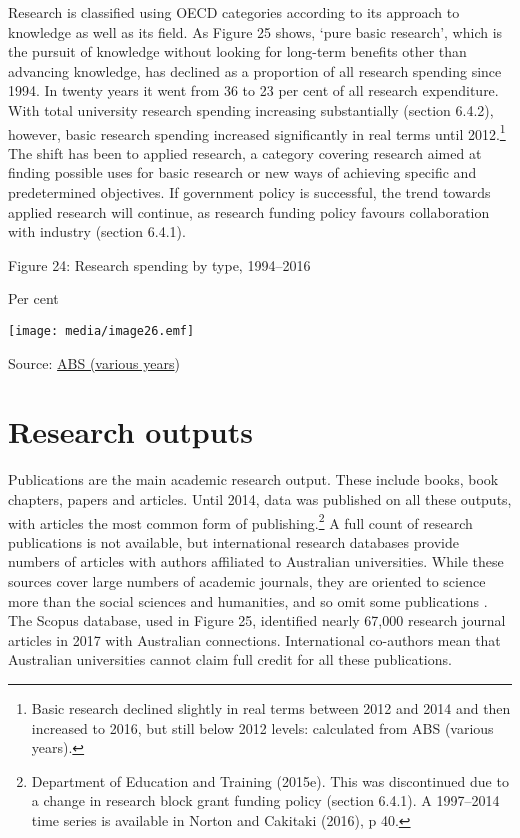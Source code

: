 \documentclass[]{book}
\begin{document}
Research is classified using OECD categories according to its approach to knowledge as well as its field. As Figure 25 shows, `pure basic research', which is the pursuit of knowledge without looking for long-term benefits other than advancing knowledge, has declined as a proportion of all research spending since 1994. In twenty years it went from 36 to 23 per cent of all research expenditure. With total university research spending increasing substantially (section 6.4.2), however, basic research spending increased significantly in real terms until 2012.\footnote{Basic research declined slightly in real terms between 2012 and 2014 and then increased to 2016, but still below 2012 levels: calculated from ABS (various years).} The shift has been to applied research, a category covering research aimed at finding possible uses for basic research or new ways of achieving specific and predetermined objectives. If government policy is successful, the trend towards applied research will continue, as research funding policy favours collaboration with industry (section 6.4.1).

\protect\hypertarget{_Toc523322084}{}{}Figure 24: Research spending by type, 1994--2016

Per cent

\texttt{[image: media/image26.emf]}

Source: \protect\hyperlink{_ENREF_13}{ABS (various years})

\hypertarget{research-outputs}{%
\section{Research outputs}\label{research-outputs}}

Publications are the main academic research output. These include books, book chapters, papers and articles. Until 2014, data was published on all these outputs, with articles the most common form of publishing.\footnote{Department of Education and Training (2015e). This was discontinued due to a change in research block grant funding policy (section 6.4.1). A 1997--2014 time series is available in Norton and Cakitaki (2016), p 40.} A full count of research publications is not available, but international research databases provide numbers of articles with authors affiliated to Australian universities. While these sources cover large numbers of academic journals, they are oriented to science more than the social sciences and humanities, and so omit some publications . The Scopus database, used in Figure 25, identified nearly 67,000 research journal articles in 2017 with Australian connections. International co-authors mean that Australian universities cannot claim full credit for all these publications.
\end{document}
